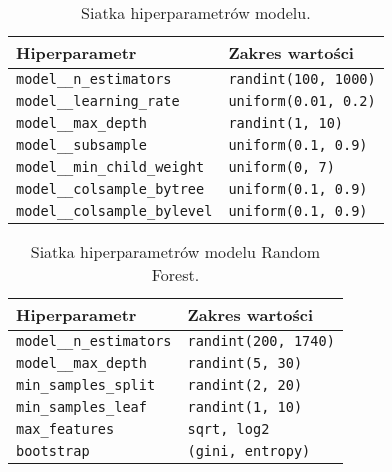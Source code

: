 \documentclass[a4paper,11pt]{article}
\begin{document}
\begin{table}[H]
\centering
\caption{Siatka hiperparametrów modelu.}
\vspace{1ex}
\label{tab:hyperparam_grid}
\begin{tabular}{|l|l|}
\hline
\textbf{Hiperparametr}         & \textbf{Zakres wartości}                  \\ \hline
\texttt{model\_\_n\_estimators}    & \texttt{randint(100, 1000)}             \\ \hline
\texttt{model\_\_learning\_rate}   & \texttt{uniform(0.01, 0.2)}            \\ \hline
\texttt{model\_\_max\_depth}       & \texttt{randint(1, 10)}                \\ \hline
\texttt{model\_\_subsample}        & \texttt{uniform(0.1, 0.9)}             \\ \hline
\texttt{model\_\_min\_child\_weight} & \texttt{uniform(0, 7)}                \\ \hline
\texttt{model\_\_colsample\_bytree} & \texttt{uniform(0.1, 0.9)}            \\ \hline
\texttt{model\_\_colsample\_bylevel} & \texttt{uniform(0.1, 0.9)}            \\ \hline
\end{tabular}
\end{table}

\begin{table}[H]
\centering
\caption{Siatka hiperparametrów modelu Random Forest.}
\vspace{1ex}
\label{tab:hyperparam_grid}
\begin{tabular}{|l|l|}
\hline
\textbf{Hiperparametr}         & \textbf{Zakres wartości}                  \\ \hline
\texttt{model\_\_n\_estimators}    & \texttt{randint(200, 1740)}             \\ \hline
\texttt{model\_\_max\_depth}       & \texttt{randint(5, 30)}                \\ \hline
\texttt{min\_samples\_split}        & \texttt{randint(2, 20)}             \\ \hline
\texttt{min\_samples\_leaf} & \texttt{randint(1, 10)}                \\ \hline
\texttt{max\_features} & \texttt{sqrt, log2}            \\ \hline
\texttt{bootstrap} & \texttt{(gini, entropy)}            \\ \hline
\end{tabular}
\end{table}
\end{document}
